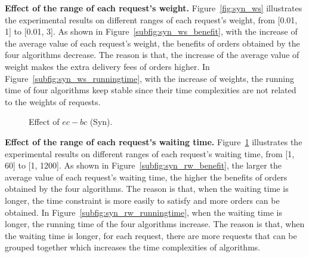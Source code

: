 \textbf{Effect of the range of each request's weight.}  Figure~\ref{fig:syn_ws} illustrates the experimental results on different ranges of each request's weight, from [0.01, 1] to [0.01, 3]. As shown in Figure~\ref{subfig:syn_ws_benefit}, with the increase of the average value of each request's weight, the benefits of orders obtained by the four algorithms decrease. The reason is that, the increase of the average value of weight makes the extra delivery fees of orders higher. In Figure~\ref{subfig:syn_ws_runningtime}, with the increase of weights, the running time of four algorithms keep stable since their time complexities are not related to the weights of requests.

\begin{figure}[t!]\centering
	\subfigcapskip=-5pt
	\vspace{1ex}	
	\vspace{-2ex}
	\addtocounter{subfigure}{-1}
	\figureCaptionMargin
	\vspace{1ex}
	\caption{\small Effect of $ec-bc$ (Syn).}\figureBelowMargin
	\label{fig:syn_rw}
\end{figure}

\textbf{Effect of the range of each request's waiting time.} Figure~\ref{fig:syn_rw} illustrates the experimental results on different ranges of each request's waiting time, from [1, 60] to [1, 1200]. As shown in Figure~\ref{subfig:syn_rw_benefit}, the larger the average value of each request's waiting time, the higher the benefits of orders obtained by the four algorithms. The reason is that, when the waiting time is longer, the time constraint is more easily to satisfy and more orders can be obtained. In Figure~\ref{subfig:syn_rw_runningtime}, when the waiting time is longer, the running time of the four algorithms increase. The reason is that, when the waiting time is longer, for each request, there are more requests that can be grouped together which increases the time complexities of algorithms.

